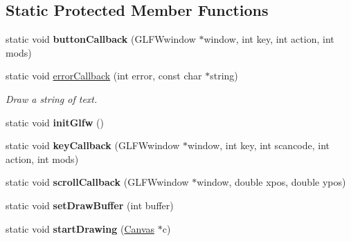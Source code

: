 \subsection*{Static Protected Member Functions}
\begin{DoxyCompactItemize}
\item 
\mbox{\label{classtsgl_1_1_canvas_affafbd93ea7a8c8bbaeff7192603847d}} 
static void {\bfseries button\+Callback} (G\+L\+F\+Wwindow $\ast$window, int key, int action, int mods)
\item 
static void \hyperlink{classtsgl_1_1_canvas_a8a737119caedf815918f10e7092ad824}{error\+Callback} (int error, const char $\ast$string)
\begin{DoxyCompactList}\small\item\em Draw a string of text. \end{DoxyCompactList}\item 
\mbox{\label{classtsgl_1_1_canvas_a8ceafa56589bb6802de6025bc0fffaba}} 
static void {\bfseries init\+Glfw} ()
\item 
\mbox{\label{classtsgl_1_1_canvas_af4e9a35067b9eb9126a9843102f5c5d5}} 
static void {\bfseries key\+Callback} (G\+L\+F\+Wwindow $\ast$window, int key, int scancode, int action, int mods)
\item 
\mbox{\label{classtsgl_1_1_canvas_aa33caed8c3ef05b1c89267c88abceea5}} 
static void {\bfseries scroll\+Callback} (G\+L\+F\+Wwindow $\ast$window, double xpos, double ypos)
\item 
\mbox{\label{classtsgl_1_1_canvas_af565a4f8a3c4afe406b697984b1519fc}} 
static void {\bfseries set\+Draw\+Buffer} (int buffer)
\item 
\mbox{\label{classtsgl_1_1_canvas_af4aa55d690e64ad67f9850a9b9db032e}} 
static void {\bfseries start\+Drawing} (\hyperlink{classtsgl_1_1_canvas}{Canvas} $\ast$c)
\end{DoxyCompactItemize}
